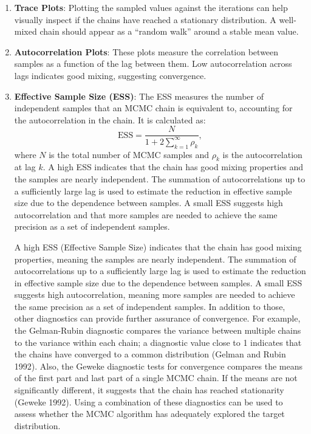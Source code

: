 \documentclass[
  letterpaper,
]{krantz}
\begin{document}
\begin{enumerate}
\def\labelenumi{\arabic{enumi}.}
\item
  \textbf{Trace Plots}: Plotting the sampled values against the
  iterations can help visually inspect if the chains have reached a
  stationary distribution. A well-mixed chain should appear as a
  ``random walk'' around a stable mean value.
\item
  \textbf{Autocorrelation Plots}: These plots measure the correlation
  between samples as a function of the lag between them. Low
  autocorrelation across lags indicates good mixing, suggesting
  convergence.
\item
  \textbf{Effective Sample Size (ESS)}: The ESS measures the number of
  independent samples that an MCMC chain is equivalent to, accounting
  for the autocorrelation in the chain. It is calculated as: \[
  \text{ESS} = \frac{N}{1 + 2 \sum_{k=1}^{\infty} \rho_k},
  \] where \(N\) is the total number of MCMC samples and \(\rho_k\) is
  the autocorrelation at lag \(k\). A high ESS indicates that the chain
  has good mixing properties and the samples are nearly independent. The
  summation of autocorrelations up to a sufficiently large lag is used
  to estimate the reduction in effective sample size due to the
  dependence between samples. A small ESS suggests high autocorrelation
  and that more samples are needed to achieve the same precision as a
  set of independent samples.

  A high ESS (Effective Sample Size) indicates that the chain has good
  mixing properties, meaning the samples are nearly independent. The
  summation of autocorrelations up to a sufficiently large lag is used
  to estimate the reduction in effective sample size due to the
  dependence between samples. A small ESS suggests high autocorrelation,
  meaning more samples are needed to achieve the same precision as a set
  of independent samples. In addition to those, other diagnostics can
  provide further assurance of convergence. For example, the
  Gelman-Rubin diagnostic compares the variance between multiple chains
  to the variance within each chain; a diagnostic value close to 1
  indicates that the chains have converged to a common distribution
  (Gelman and Rubin 1992). Also, the Geweke diagnostic tests for
  convergence compares the means of the first part and last part of a
  single MCMC chain. If the means are not significantly different, it
  suggests that the chain has reached stationarity (Geweke 1992). Using
  a combination of these diagnostics can be used to assess whether the
  MCMC algorithm has adequately explored the target distribution.
\end{enumerate}
\end{document}

